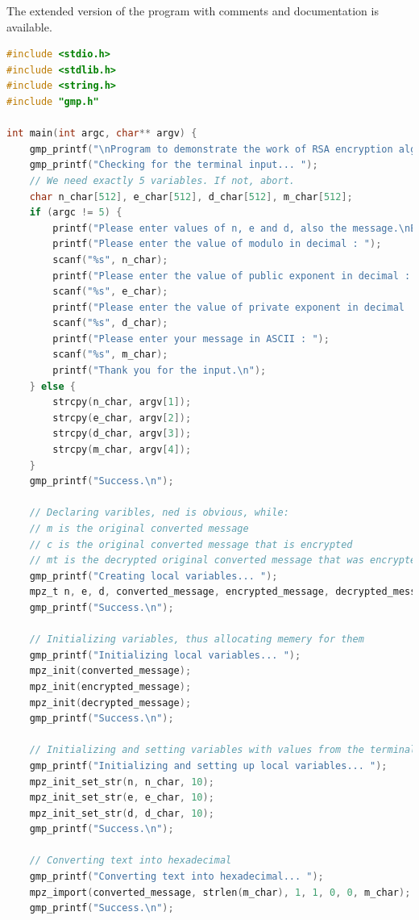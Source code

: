 \documentclass[a4paper, 12pt]{article}
\begin{document}
The extended version of the program with comments and documentation is available\cite{github}.

\begin{lstlisting}[language=C, caption=Source Code of rsa.c]
#include <stdio.h> 
#include <stdlib.h>
#include <string.h>
#include "gmp.h"

int main(int argc, char** argv) {
    gmp_printf("\nProgram to demonstrate the work of RSA encryption algorithm.\n\n");
    gmp_printf("Checking for the terminal input... ");
    // We need exactly 5 variables. If not, abort.
    char n_char[512], e_char[512], d_char[512], m_char[512];
    if (argc != 5) {
        printf("Please enter values of n, e and d, also the message.\nExiting...\n");
        printf("Please enter the value of modulo in decimal : ");
        scanf("%s", n_char);
        printf("Please enter the value of public exponent in decimal : ");
        scanf("%s", e_char);
        printf("Please enter the value of private exponent in decimal : ");
        scanf("%s", d_char);
        printf("Please enter your message in ASCII : ");
        scanf("%s", m_char);
        printf("Thank you for the input.\n");
    } else {
        strcpy(n_char, argv[1]);
        strcpy(e_char, argv[2]);
        strcpy(d_char, argv[3]);
        strcpy(m_char, argv[4]);
    }
    gmp_printf("Success.\n");
    
    // Declaring varibles, ned is obvious, while:
    // m is the original converted message
    // c is the original converted message that is encrypted
    // mt is the decrypted original converted message that was encrypted 
    gmp_printf("Creating local variables... ");
    mpz_t n, e, d, converted_message, encrypted_message, decrypted_message;
    gmp_printf("Success.\n");
    
    // Initializing variables, thus allocating memery for them
    gmp_printf("Initializing local variables... ");
    mpz_init(converted_message);
    mpz_init(encrypted_message);
    mpz_init(decrypted_message);
    gmp_printf("Success.\n");
    
    // Initializing and setting variables with values from the terminal input
    gmp_printf("Initializing and setting up local variables... ");
    mpz_init_set_str(n, n_char, 10);
    mpz_init_set_str(e, e_char, 10);
    mpz_init_set_str(d, d_char, 10);
    gmp_printf("Success.\n");
    
    // Converting text into hexadecimal
    gmp_printf("Converting text into hexadecimal... ");
    mpz_import(converted_message, strlen(m_char), 1, 1, 0, 0, m_char);
    gmp_printf("Success.\n");
  

\end{lstlisting}
\end{document}
